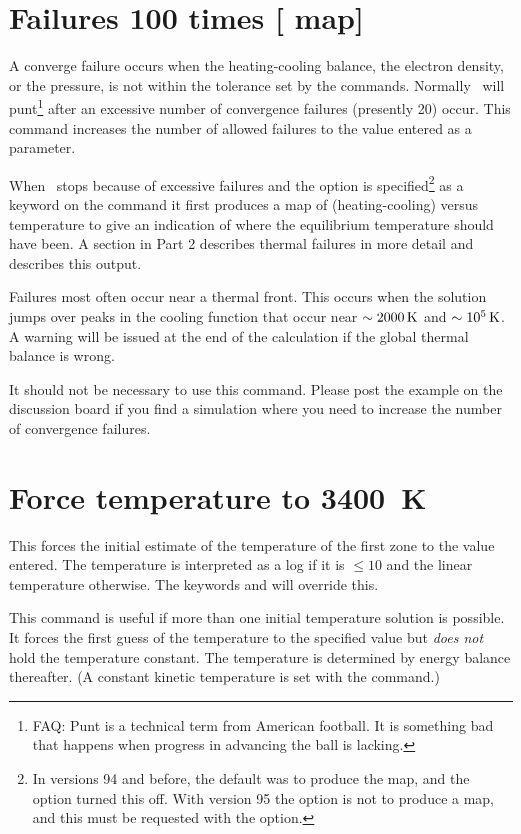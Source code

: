 \section{Failures 100 times [ map]}

A converge failure occurs when the heating-cooling balance,
the electron
density, or the pressure, is not within the tolerance set by the
 commands.
Normally \Cloudy\ will
punt\footnote{FAQ:  Punt is a technical term from American football.
It is
something bad that happens when progress in advancing the ball is lacking.}
after an excessive number of convergence failures (presently 20)
occur.
This command increases the number of allowed failures to the value
entered as a parameter.

When \Cloudy\ stops because of excessive failures and the
 option is
specified\footnote{In versions 94 and before,
the default was to produce the map, and
the  option turned this off.
With version 95 the option is not to
produce a map, and this must be requested with the
 option.}
as a keyword on the  command it first
produces a map
of (heating-cooling) versus temperature to give an indication
of where the
equilibrium temperature should have been.
A section in Part 2 describes
thermal failures in more detail and describes this output.

Failures most often occur near a thermal front.
This occurs when the
solution jumps over peaks in the cooling function that occur near
$\sim2000 {\rm\thinspace K}$ and $\sim 10^5 {\rm\thinspace K}$.
A warning will be issued at the end of the calculation if
the global thermal balance is wrong.

It should not be necessary to use this command.
Please post the example
on the discussion board if you find a simulation where you need to
increase the number of convergence failures.

\section{Force temperature to 3400~K}

This forces the initial estimate of the temperature of the first zone
to the value entered.  The temperature is interpreted as a log if it is
$\le 10$ and the linear temperature otherwise.
The keywords  and  will override this.

This command is useful if more than one initial temperature solution
is possible.
It forces the first guess of the temperature to the specified
value but \emph{does not} hold the temperature constant.
The temperature is
determined by energy balance thereafter.
(A constant kinetic temperature
is set with the  command.)


